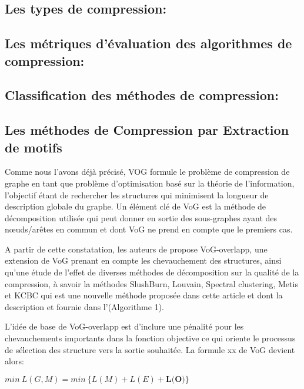 \documentclass[11pt,a4paper]{report}
\theoremstyle{definition}
\begin{document}
			\subsection{Les types de compression:}
			
			
	
			\subsection{Les métriques d'évaluation des algorithmes de compression:}
				
			
			\subsection{Classification des méthodes de compression:}
			
			\subsection{Les méthodes de Compression par Extraction de motifs}
			
			Comme nous l'avons déjà précisé, VOG formule le problème de compression de graphe en tant que problème d'optimisation basé sur la théorie de l'information, l'objectif étant de rechercher les structures  qui minimisent la longueur de description globale du graphe. Un élément clé de VoG est la méthode de décomposition utilisée qui peut donner en sortie des sous-graphes ayant des nœuds/arêtes en commun et dont VoG ne prend en compte que le premiers cas. 
			
			A partir de cette constatation, les auteurs de \citep{liu2015empirical} propose VoG-overlapp, une extension de VoG prenant en compte les chevauchement des structures, ainsi qu'une étude de l'effet de diverses méthodes de décomposition sur la qualité de la compression, à savoir la méthodes SlushBurn, Louvain, Spectral clustering, Metis et KCBC qui est une nouvelle méthode proposée dans cette article et dont la description et fournie dans l'(Algorithme 1).
			
			
			
			L'idée de base de VoG-overlapp est d'inclure une pénalité pour les chevauchements importants dans la fonction objective ce qui oriente le processus de sélection des structure vers la sortie souhaitée. La formule xx de VoG devient alors:
			\begin{center}
				$min\ L(G,M) = min\ \big\{L(M) + L(E) +\textbf{L(O)}\big\}$
			\end{center}
			
\end{document}
